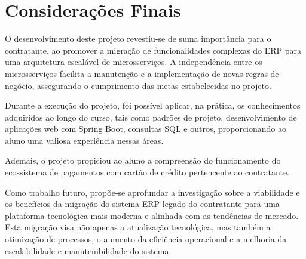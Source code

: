 \chapter{Considerações Finais}
\label{cap:conclusoes}

O desenvolvimento deste projeto revestiu-se de suma importância para o contratante, ao promover a migração de 
funcionalidades complexas do ERP para uma arquitetura escalável de microsserviços. A independência entre os 
microsserviços facilita a manutenção e a implementação de novas regras de negócio, assegurando o cumprimento das metas 
estabelecidas no projeto.

Durante a execução do projeto, foi possível aplicar, na prática, os conhecimentos adquiridos ao longo do curso, 
tais como padrões de projeto, desenvolvimento de aplicações web com Spring Boot, consultas SQL e outros, proporcionando 
ao aluno uma valiosa experiência nessas áreas.

Ademais, o projeto propiciou ao aluno a compreensão do funcionamento do ecossistema de pagamentos com cartão de crédito 
pertencente ao contratante.

Como trabalho futuro, propõe-se aprofundar a investigação sobre a viabilidade e os benefícios da migração do sistema ERP 
legado do contratante para uma plataforma tecnológica mais moderna e alinhada com as tendências de mercado. Esta migração 
visa não apenas a atualização tecnológica, mas também a otimização de processos, o aumento da eficiência operacional e a 
melhoria da escalabilidade e manutenibilidade do sistema.


